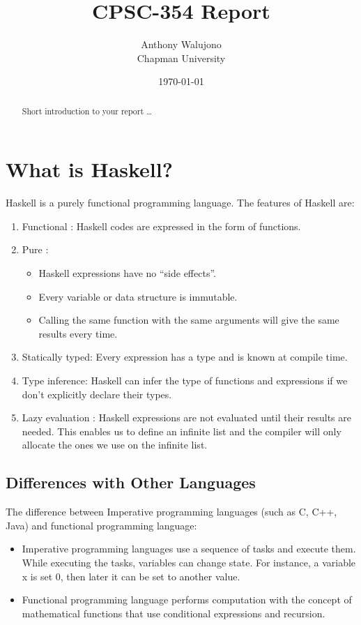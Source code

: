 \documentclass{article}
\title{CPSC-354 Report}
\author{Anthony Walujono  \\ Chapman University}
\date{\today}
\begin{document}
\maketitle

\begin{abstract}
Short introduction to your report \ldots 
\end{abstract}

\tableofcontents

\newpage
\section{What is Haskell?}\label{What is Haskell?}
Haskell is a purely functional programming language. The features of Haskell are:
\begin{enumerate}
  \item Functional : Haskell codes are expressed in the form of functions.
  \item Pure : 
  \begin{itemize}
    \item Haskell expressions have no “side effects”.
    \item Every variable or data structure is immutable.
    \item Calling the same function with the same arguments will give the same results every time.
  \end{itemize}
  \item Statically typed: Every expression has a type and is known at compile time.
  \item Type inference: Haskell can infer the type of functions and expressions if we don't explicitly declare their types.
  \item Lazy evaluation : Haskell expressions are not evaluated until their results are needed. This enables us to define an infinite list and the compiler will only allocate the ones we use on the infinite list.
\end{enumerate}

\subsection{Differences with Other Languages}

The difference between Imperative programming languages (such as C, C++, Java) and functional programming language:
\begin{itemize}
  \item Imperative programming languages use a sequence of tasks and execute them. While executing the tasks, variables can change state. For instance, a variable x is set 0, then later it can be set to another value. 
  \item Functional programming language performs computation with the concept of mathematical functions that use conditional expressions and recursion.
\end{itemize}
 
\end{document}
